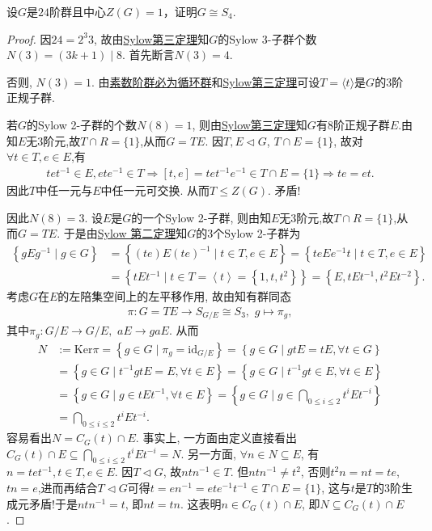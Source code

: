 \documentclass[../../main.tex]{subfiles}%
\begin{document}
\begin{example}
设$G$是$24$阶群且中心$Z(G)=1$，证明$G \cong S_4$.
\end{example}
\begin{proof}

因$24=2^3 3$, 故由\hyperref[theorem:Sylow第三定理]{Sylow第三定理}知$G$的Sylow 3-子群个数$N(3)=(3k+1) \mid 8$. 首先断言$N(3)=4$.

否则, $N(3)=1$. 由\hyperref[proposition:素数阶群必为循环群]{素数阶群必为循环群}和\hyperref[theorem:Sylow第三定理]{Sylow第三定理}可设$T=\langle t \rangle$是$G$的$3$阶正规子群.

若$G$的Sylow 2-子群的个数$N(8)=1$, 则由\hyperref[theorem:Sylow第三定理]{Sylow第三定理}知$G$有$8$阶正规子群$E$.由知$E$无3阶元,故$T\cap R=\{1\}$,从而$G=TE$. 因$T,E \lhd G$, $T \cap E=\{1\}$, 故对$\forall t\in T,e\in E$,有
\begin{align*}
tet^{-1}\in E,ete^{-1}\in T\Longrightarrow[t,e]=tet^{-1}e^{-1}\in T\cap E=\{1\}\Longrightarrow te=et.
\end{align*}
因此$T$中任一元与$E$中任一元可交换. 从而$T \leqslant Z(G)$. 矛盾!

因此$N(8)=3$. 设$E$是$G$的一个Sylow 2-子群, 则由知$E$无3阶元,故$T\cap R=\{1\}$,从而$G=TE$. 于是由\hyperref[theorem:Sylow 第二定理]{Sylow 第二定理}知$G$的$3$个Sylow 2-子群为
\begin{align*}
\left\{ gEg^{-1}\mid g\in G \right\} &=\left\{ \left( te \right) E\left( te \right) ^{-1}\mid t\in T,e\in E \right\} =\left\{ teEe^{-1}t\mid t\in T,e\in E \right\} 
\\
&=\left\{ tEt^{-1}\mid t\in T=\left< t \right> =\left\{ 1,t,t^2 \right\} \right\} =\left\{ E,tEt^{-1},t^2Et^{-2} \right\} .
\end{align*}
考虑$G$在$E$的左陪集空间上的左平移作用, 故由知有群同态
\begin{align*}
\pi: G=TE \to S_{G/E} \cong S_3,\,\,g\mapsto \pi_g,
\end{align*}
其中$\pi_g:G/E\to G/E,\,\,aE\to gaE$.
从而
\begin{align*}
N&:=\mathrm{Ker}\pi =\left\{ g\in G\mid \pi _g=\mathrm{id}_{G/E} \right\} =\left\{ g\in G\mid gtE=tE,\forall t\in G \right\} 
\\
&=\left\{ g\in G\mid t^{-1}gtE=E,\forall t\in E \right\} =\left\{ g\in G\mid t^{-1}gt\in E,\forall t\in E \right\} 
\\
&=\left\{ g\in G\mid g\in tEt^{-1},\forall t\in E \right\} =\left\{ g\in G\mid g\in \bigcap_{0\leqslant i\leqslant 2}{t^iEt^{-i}} \right\} 
\\
&=\bigcap_{0\leqslant i\leqslant 2}{t^iEt^{-i}}.
\end{align*}
容易看出$N = C_G(t) \cap E$. 事实上, 一方面由定义直接看出$C_G(t) \cap E \subseteq \bigcap\limits_{0 \leqslant i \leqslant 2} t^i E t^{-i} = N$. 另一方面, $\forall n \in N\subseteq E$, 有$n = tet^{-1}, t\in T,e \in E$. 因$T \lhd G$, 故$ntn^{-1} \in T$. 但$ntn^{-1} \neq t^2$, 否则$t^2 n = nt = te$, $tn = e$,进而再结合$T\lhd G$可得$t=en^{-1}=ete^{-1}t^{-1}\in T\cap E=\{1\}$, 这与$t$是$T$的3阶生成元矛盾!于是$ntn^{-1} = t$, 即$nt = tn$. 这表明$n \in C_G(t) \cap E$, 即$N \subseteq C_G(t) \cap E$.


\end{proof}
\end{document}
